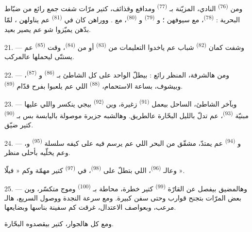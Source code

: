 ومن  \textsuperscript{(76)} النادي، المزيّنة بـ
\textsuperscript{(77)} ومدافع وقذائف، كتير مرّات شفت جمع رائع من ضبّاط
البحرية :  \textsuperscript{(78)}، مع سيوفهن ؛
و  \textsuperscript{(79)}
و \textsuperscript{(80)}، مع .
ووراهن كان في  \textsuperscript{(81)} عم يناولهن
، لمّا بدّهن يميّزوا شو عم يصير بعيد.

21. --- وشفت كمان  \textsuperscript{(82)} شباب عم
ياخدوا التعليمات من  \textsuperscript{(83)} أو من
 \textsuperscript{(84)}، وقت 
\textsuperscript{(85)} عم يستنّى ليحملها عالمركب.

22. --- ومن هالشرفة، المنظر رائع : بيطلّ الواحد على كل الشاطئ
بـ \textsuperscript{(86)} و
\textsuperscript{(87)}، وبيشوف، بساعة الاستحمام، 
\textsuperscript{(88)} اللي عم يلعبوا بفرح قدّام 
\textsuperscript{(89)}.

23. --- وبآخر الشاطئ، الساحل بيعمل 
\textsuperscript{(91)}  زغيرة، وين 
\textsuperscript{(92)} بيجي ينكسر واللي عليها مبنيّة 
\textsuperscript{(93)}، عم تدلّ بالليل البحّارة عالطريق. وهالشبه جزيرة
موصولة باليابسة بس بـ \textsuperscript{(90)} كتير ضيّق.

\VUsaut{3.0mm}
\VUsaut{3.0mm}

24. --- و \textsuperscript{(94)} عم يمتدّ، مشقّق من البحر
اللي عم يرسم فيه على كيفه سلسلة  \textsuperscript{(95)}
و، وعم يخلّيه بأحلى منظر.

وعالـ \textsuperscript{(96)}، اللي بتطلّ على
 \textsuperscript{(98)}، في 
\textsuperscript{(97)} كتير مهمّة وكم « فيلّا ».

25. --- وهالمضيق بيفصل عن القارّة  \textsuperscript{(99)}
كتير خطرة، محاطة بـ \textsuperscript{(100)} وموج متكسّر، وين
بعض المرّات بتجنح قوارب وحتى سفن كبيرة. ومع سرعة النجدة ووصول
 السريع، هالـ مرعب، وبعواصف
الاعتدال، غرقت كم سفينة بناسها وبضايعها.

ومع كل هالجوار،  كتير بيقصدوه البحّارة.

\VUsaut{6.0mm}
\VUfilet{22mm}
